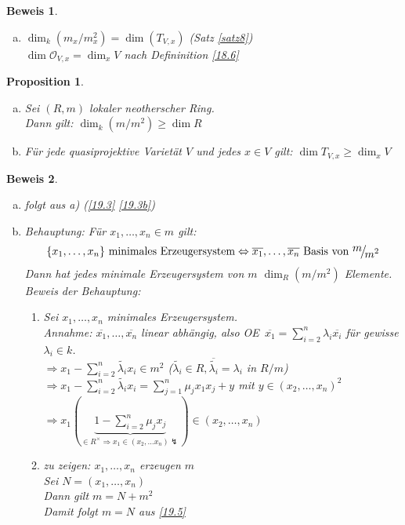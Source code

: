 \documentclass[a4paper,12pt]{report}
\theoremstyle{break}
\newtheorem{Prop}[Def]{Proposition}
\theoremstyle{nonumberbreak}
\newtheorem{Bew}{Beweis}
\theoremstyle{nonumberplain}
\newcommand{\quot}[1]{\textrm{\glqq}{#1}\textrm{\grqq}}
\newenvironment{twosidedproof}{\begin{enumerate}[\quot{$\Rightarrow$}:]}{\end{enumerate}}
\newcommand{\proofforward}{\item[\quot{$\Rightarrow$}:]}
\newcommand{\proofreverse}{\item[\quot{$\Leftarrow$}:]}
\newcommand{\calO}{\mathcal{O}}
\newcommand{\FakRaum}[2]{
  \raisebox{0.7ex}{\ensuremath{#1}}
  \ensuremath{\mkern-3mu}\big/\ensuremath{\mkern-3mu}
  \raisebox{-0.6ex}{\ensuremath{#2}}}
\renewcommand{\OE}{O\!\!E~}
\begin{document}
\begin{Bew}\begin{enumerate}[a)]
\item[b)]
	$\dim_k(m_x/m_x^2)=\dim(T_{V,x})$ (Satz \ref{satz8})\\
	$\dim \calO_{V,x}=\dim_x V$ nach Defininition \ref{18.6}
\end{enumerate}\end{Bew}

\begin{Prop}\label{19.4}\begin{enumerate}[a)]
\item
	Sei $(R,m)$ lokaler neotherscher Ring.\\
	Dann gilt: $\dim_k(m/m^2)\ge\dim R$
\item
	F\"ur jede quasiprojektive Variet\"at $V$ und jedes $x\in V$ gilt: $\dim T_{V,x}\ge\dim_xV$
\end{enumerate}\end{Prop}

\begin{Bew}\begin{enumerate}[a)]
\item[b)]
	folgt aus a) (\ref{19.3} \ref{19.3b})
\item[a)]
	\emph{Behauptung:} F\"ur $x_1,\ldots ,x_n\in m$ gilt:
		\[\{x_1,\ldots ,x_n\} \text{ minimales Erzeugersystem} \Leftrightarrow \overline{x_1},\ldots ,\overline{x_n} \text{ Basis von } \FakRaum{m}{m^2}\]
	Dann hat jedes minimale Erzeugersystem von $m$ $\dim_R(m/m^2)$ Elemente.\\
	\emph{Beweis der Behauptung:}\begin{twosidedproof}
	\proofforward
		Sei $x_1,\ldots ,x_n$ minimales Erzeugersystem.\\
		\emph{Annahme:} $\overline{x_1},\ldots ,\overline{x_n}$ linear abh\"angig, also \OE $\overline{x_1}=\sum\limits_{i=2}^n\lambda_i\overline{x_i}$ f\"ur gewisse $\lambda_i\in k$.\\
		$\Rightarrow x_1-\sum\limits_{i=2}^n\tilde{\lambda_i}x_i\in m^2$ ($\tilde{\lambda_i}\in R, \overline{\tilde{\lambda_i}}=\lambda_i$ in $R/m$)\\
		$\Rightarrow x_1-\sum\limits_{i=2}^n\tilde{\lambda_i}x_i = \sum\limits_{j=1}^n\mu_jx_1x_j+y$ mit $y\in(x_2,\ldots ,x_n)^2$\\
		$\Rightarrow x_1(\underbrace{1-\sum\limits_{i=2}^n\mu_jx_j}_{\in R^\times \Rightarrow x_1 \in (x_2,\ldots x_n) \lightning})\in (x_2,\ldots ,x_n)$
	\proofreverse
		\emph{zu zeigen:} $x_1,\ldots ,x_n$ erzeugen $m$\\
		Sei $N=(x_1,\ldots ,x_n)$\\
		Dann gilt $m=N+m^2$\\
		Damit folgt $m=N$ aus \ref{19.5}
	\end{twosidedproof}
\end{enumerate}\end{Bew}
\end{document}
